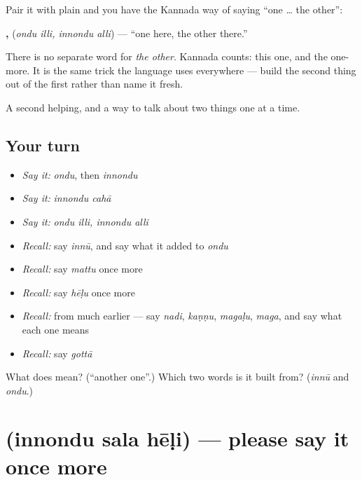 \begin{grammarlens}[title={Grammar Lens: one, and one more}]
Pair it with plain  and you have the Kannada way of saying \textquotedblleft{}one … the other\textquotedblright{}:

\textbf{ ,  } (\emph{ondu illi, innondu alli}) — \textquotedblleft{}one here, the other there.\textquotedblright{}

There is no separate word for \emph{the other}. Kannada counts: this one, and the one-more. It is the same trick the language uses everywhere — build the second thing out of the first rather than name it fresh.
\end{grammarlens}

\begin{grammarlens}[title={What you've built}]
A second helping, and a way to talk about two things one at a time.
\end{grammarlens}

\subsection*{Your turn}
\begin{itemize}
\raggedright
  \item \emph{Say it:} \emph{ondu}, then \emph{innondu}
  \item \emph{Say it:} \emph{innondu cahā}
  \item \emph{Say it:} \emph{ondu illi, innondu alli}
  \item \emph{Recall:} say \emph{innū}, and say what it added to \emph{ondu}
  \item \emph{Recall:} say \emph{mattu} once more
  \item \emph{Recall:} say \emph{hēḷu} once more
  \item \emph{Recall:} from much earlier — say \emph{nadi}, \emph{kaṇṇu}, \emph{magaḷu}, \emph{maga}, and say what each one means
  \item \emph{Recall:} say \emph{gottā}
\end{itemize}

\begin{tcolorbox}[breakable,colback=teal!4,colframe=teal!35!black,title={Before you move on}]
What does  mean? (\textquotedblleft{}another one\textquotedblright{}.) Which two words is it built from? (\emph{innū} and \emph{ondu}.)
\end{tcolorbox}
\section[\texorpdfstring{\kn{ಇನ್ನೊಂದು} \kn{ಸಲ} \kn{ಹೇಳಿ} (innondu sala hēḷi)}{ಇನ್ನೊಂದು ಸಲ ಹೇಳಿ (innondu sala hēḷi)}]{   (innondu sala hēḷi) — please say it once more}


